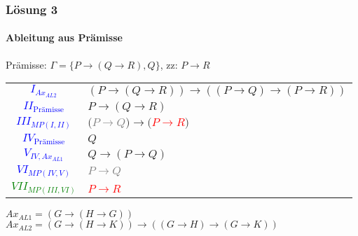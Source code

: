\begin{frame}
	\frametitle{Lösung 3}
	\framesubtitle{Ableitung aus Prämisse}
	Prämisse: $\Gamma =\{P\rightarrow(Q\rightarrow R), Q\}$, zz: $P\rightarrow R$\\
	\begin{tabular}{cl}
		\textcolor{blue}{$I_{Ax_{AL2}}$}         & $(P\rightarrow(Q\rightarrow R))\rightarrow((P\rightarrow Q)\rightarrow(P\rightarrow R))$ \\
		\textcolor{blue}{$II_{\text{Prämisse}}$} & $P\rightarrow(Q\rightarrow R)$                                                           \\
		\textcolor{blue}{$III_{MP(I, II)}$}      & $($\textcolor{gray}{$P\rightarrow Q$}$)\rightarrow($\textcolor{red}{$P\rightarrow R$}$)$ \\
		\textcolor{blue}{$IV_{\text{Prämisse}}$} & $Q$                                                                                      \\
		\textcolor{blue}{$V_{IV, Ax_{AL1}}$}     & $Q\rightarrow(P\rightarrow Q)$                                                           \\
		\textcolor{blue}{$VI_{MP(IV, V)}$}       & \textcolor{gray}{$P\rightarrow Q$}                                                       \\
		\textcolor{green}{$VII_{MP(III, VI)}$}   & \textcolor{red}{$P\rightarrow R$}                                                        \\
	\end{tabular}
	$Ax_{AL1} = (G\rightarrow(H\rightarrow G))$\\
	$Ax_{AL2} = (G\rightarrow(H\rightarrow K))\rightarrow((G\rightarrow H)\rightarrow(G\rightarrow K))$\\
\end{frame}
